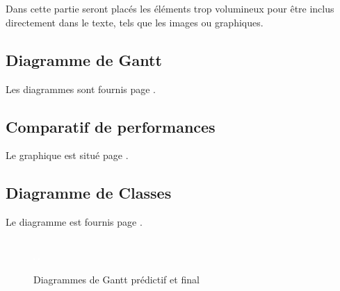 \documentclass[a4paper]{memoir}
\begin{document}
	\appendix
	\chapter{}
		Dans cette partie seront placés les éléments trop volumineux pour être inclus directement dans le texte, tels que les images ou graphiques.\\
		
		\section{Diagramme de Gantt}
			Les diagrammes sont fournis page \pageref{fig:gantt}.
			
		\section{Comparatif de performances}
			Le graphique est situé page \pageref{fig:analyse}.
			
		\section{Diagramme de Classes}
			Le diagramme est fournis page \pageref{fig:diagClass}.
			
		\section*{}
			\begin{figure}
				\vspace{-3,5cm} \hspace{-4,5cm} \includegraphics[scale=0.6]{img/Gantt1.png}
				\vspace{-3,5cm} \hspace{-4,5cm} \includegraphics[scale=0.6]{img/Gantt2.png}
				\label{fig:gantt}
				\vspace{-0,5cm} \caption{Diagrammes de Gantt prédictif et final}
			\end{figure}
			
\end{document}
